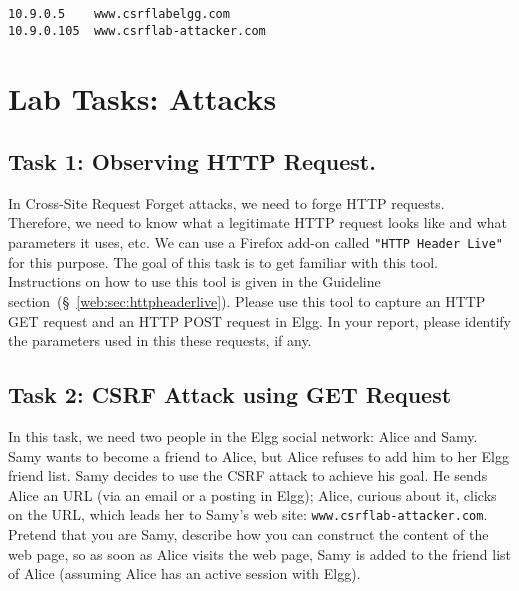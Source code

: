 \begin{lstlisting}
10.9.0.5    www.csrflabelgg.com
10.9.0.105  www.csrflab-attacker.com
\end{lstlisting}


\vspace{-0.1in}



\vspace{-0.1in}



\section{Lab Tasks: Attacks}


\subsection{Task 1: Observing HTTP Request.}

In Cross-Site Request Forget attacks, we need to forge HTTP requests. 
Therefore, we need to know what a legitimate HTTP request looks like and 
what parameters it uses, etc. 
We can use a Firefox add-on called \texttt{"HTTP Header Live"} for this
purpose.  
The goal of this task is to get familiar with this tool. 
Instructions on how to use this tool is given in the Guideline
section~(\S~\ref{web:sec:httpheaderlive}).
Please use this tool to capture an HTTP GET request and an HTTP POST
request in Elgg. In your report, please identify the parameters
used in this these requests, if any. 



\subsection{Task 2: CSRF Attack using GET Request}

In this task, we need two people in the Elgg social network: Alice
and Samy. Samy wants to become a friend to Alice, but Alice refuses to add 
him to her Elgg friend list. Samy decides to use the CSRF attack to
achieve his goal. He sends Alice an URL (via an email or a posting in 
Elgg); Alice, curious about it, clicks on the URL, which leads her to Samy's web site:    
{\tt www.csrflab-attacker.com}. Pretend that you are Samy, describe how you
can construct the content of the web page, so as soon as Alice visits the
web page, Samy is added to the friend list of Alice (assuming Alice has an
active session with Elgg).


